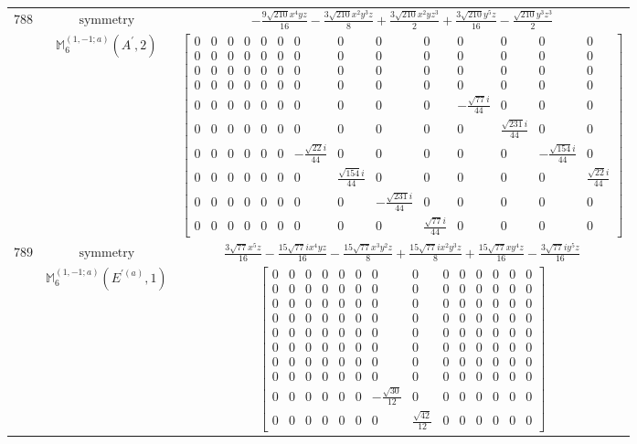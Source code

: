 \documentclass[fleqn,8pt,landscape]{jsarticle}
\begin{document}
\begin{longtable}{ccc}
$ 788 $ & $ \text{symmetry} $ & $ - \frac{9 \sqrt{210} x^{4} y z}{16} - \frac{3 \sqrt{210} x^{2} y^{3} z}{8} + \frac{3 \sqrt{210} x^{2} y z^{3}}{2} + \frac{3 \sqrt{210} y^{5} z}{16} - \frac{\sqrt{210} y^{3} z^{3}}{2} $ \\
$  $ & $ \mathbb{M}_{6}^{(1,-1;a)}(A^{\prime},2) $ & $ \begin{bmatrix} 0 & 0 & 0 & 0 & 0 & 0 & 0 & 0 & 0 & 0 & 0 & 0 & 0 & 0 \\ 0 & 0 & 0 & 0 & 0 & 0 & 0 & 0 & 0 & 0 & 0 & 0 & 0 & 0 \\ 0 & 0 & 0 & 0 & 0 & 0 & 0 & 0 & 0 & 0 & 0 & 0 & 0 & 0 \\ 0 & 0 & 0 & 0 & 0 & 0 & 0 & 0 & 0 & 0 & 0 & 0 & 0 & 0 \\ 0 & 0 & 0 & 0 & 0 & 0 & 0 & 0 & 0 & 0 & - \frac{\sqrt{77} i}{44} & 0 & 0 & 0 \\ 0 & 0 & 0 & 0 & 0 & 0 & 0 & 0 & 0 & 0 & 0 & \frac{\sqrt{231} i}{44} & 0 & 0 \\ 0 & 0 & 0 & 0 & 0 & 0 & - \frac{\sqrt{22} i}{44} & 0 & 0 & 0 & 0 & 0 & - \frac{\sqrt{154} i}{44} & 0 \\ 0 & 0 & 0 & 0 & 0 & 0 & 0 & \frac{\sqrt{154} i}{44} & 0 & 0 & 0 & 0 & 0 & \frac{\sqrt{22} i}{44} \\ 0 & 0 & 0 & 0 & 0 & 0 & 0 & 0 & - \frac{\sqrt{231} i}{44} & 0 & 0 & 0 & 0 & 0 \\ 0 & 0 & 0 & 0 & 0 & 0 & 0 & 0 & 0 & \frac{\sqrt{77} i}{44} & 0 & 0 & 0 & 0 \end{bmatrix} $ \\ \hline
$ 789 $ & $ \text{symmetry} $ & $ \frac{3 \sqrt{77} x^{5} z}{16} - \frac{15 \sqrt{77} i x^{4} y z}{16} - \frac{15 \sqrt{77} x^{3} y^{2} z}{8} + \frac{15 \sqrt{77} i x^{2} y^{3} z}{8} + \frac{15 \sqrt{77} x y^{4} z}{16} - \frac{3 \sqrt{77} i y^{5} z}{16} $ \\
$  $ & $ \mathbb{M}_{6}^{(1,-1;a)}(E^{\prime(a)},1) $ & $ \begin{bmatrix} 0 & 0 & 0 & 0 & 0 & 0 & 0 & 0 & 0 & 0 & 0 & 0 & 0 & 0 \\ 0 & 0 & 0 & 0 & 0 & 0 & 0 & 0 & 0 & 0 & 0 & 0 & 0 & 0 \\ 0 & 0 & 0 & 0 & 0 & 0 & 0 & 0 & 0 & 0 & 0 & 0 & 0 & 0 \\ 0 & 0 & 0 & 0 & 0 & 0 & 0 & 0 & 0 & 0 & 0 & 0 & 0 & 0 \\ 0 & 0 & 0 & 0 & 0 & 0 & 0 & 0 & 0 & 0 & 0 & 0 & 0 & 0 \\ 0 & 0 & 0 & 0 & 0 & 0 & 0 & 0 & 0 & 0 & 0 & 0 & 0 & 0 \\ 0 & 0 & 0 & 0 & 0 & 0 & 0 & 0 & 0 & 0 & 0 & 0 & 0 & 0 \\ 0 & 0 & 0 & 0 & 0 & 0 & 0 & 0 & 0 & 0 & 0 & 0 & 0 & 0 \\ 0 & 0 & 0 & 0 & 0 & 0 & - \frac{\sqrt{30}}{12} & 0 & 0 & 0 & 0 & 0 & 0 & 0 \\ 0 & 0 & 0 & 0 & 0 & 0 & 0 & \frac{\sqrt{42}}{12} & 0 & 0 & 0 & 0 & 0 & 0 \end{bmatrix} $ \\ \hline

\end{longtable}
\end{document}
